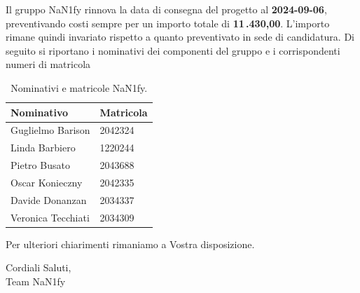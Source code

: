 \documentclass[8pt]{article}
\begin{document}
\begin{center}
	\textbf{\href{https://github.com/NaN1fy/SyncCity}{\color{myblue}{https://github.com/NaN1fy/SyncCity}}}
\end{center}
Il gruppo NaN1fy rinnova la data di consegna del progetto al \textbf{2024-09-06}, preventivando
costi sempre per un importo totale di \textbf{11\,.430,00\;\texteuro}. L’importo rimane quindi invariato
rispetto a quanto preventivato in sede di candidatura.
\clearpage
Di seguito si riportano i nominativi dei componenti del gruppo e i corrispondenti numeri di matricola\\
\begin{table}[h!]
	\centering
	\begin{tabular}{p{3cm} p{3cm}}
		\toprule
		\textbf{Nominativo} & \textbf{Matricola} \\
		\midrule
		Guglielmo Barison & 2042324 \\
		Linda Barbiero &  1220244 \\
		Pietro Busato & 2043688 \\
		Oscar Konieczny & 2042335 \\
		Davide Donanzan & 2034337 \\
		Veronica Tecchiati & 2034309 \\
		\bottomrule
	\end{tabular}
	\caption{Nominativi e matricole NaN1fy.}
	\label{table:Nominativi e matricole NaN1fy}
\end{table}
Per ulteriori chiarimenti rimaniamo a Vostra disposizione.
\vspace{1em}
\begin{flushleft}
	Cordiali Saluti,\\
	Team NaN1fy
\end{flushleft}
\clearpage
\newpage
\justifying
\end{document}
